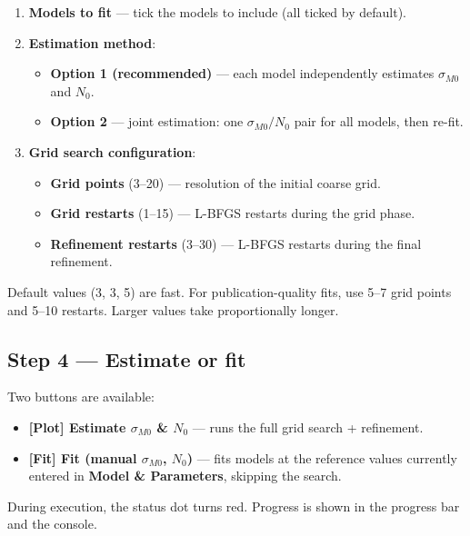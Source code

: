 \documentclass[11pt,a4paper]{article}
\newcommand{\sMzero}{\ensuremath{\sigma_{M0}}}
\newcommand{\Nzero}{\ensuremath{N_0}}
\begin{document}
\begin{enumerate}[leftmargin=1.4em]
  \item \textbf{Models to fit} --- tick the models to include (all ticked by default).
  \item \textbf{Estimation method}:
    \begin{itemize}
      \item \textbf{Option 1 (recommended)} --- each model independently estimates $\sMzero$ and $\Nzero$.
      \item \textbf{Option 2} --- joint estimation: one $\sMzero/\Nzero$ pair for all models, then re-fit.
    \end{itemize}
  \item \textbf{Grid search configuration}:
    \begin{itemize}
      \item \textbf{Grid points} (3--20) --- resolution of the initial coarse grid.
      \item \textbf{Grid restarts} (1--15) --- L-BFGS restarts during the grid phase.
      \item \textbf{Refinement restarts} (3--30) --- L-BFGS restarts during the final refinement.
    \end{itemize}
\end{enumerate}

\begin{notebox}
Default values (3, 3, 5) are fast. For publication-quality fits, use 5--7 grid points and 5--10 restarts. Larger values take proportionally longer.
\end{notebox}

\subsection{Step 4 --- Estimate or fit}

Two buttons are available:

\begin{itemize}[leftmargin=1.4em]
  \item \textbf{\textcolor{warnhl}{\textbf{[Plot]} Estimate $\sMzero$ \& $\Nzero$}} --- runs the full grid search + refinement.
  \item \textbf{\textcolor{accent}{\textbf{[Fit]} Fit (manual $\sMzero$, $\Nzero$)}} --- fits models at the reference values currently entered in \textbf{Model \& Parameters}, skipping the search.
\end{itemize}

During execution, the status dot turns \textcolor{redhl}{red}. Progress is shown in the progress bar and the console.
\end{document}
